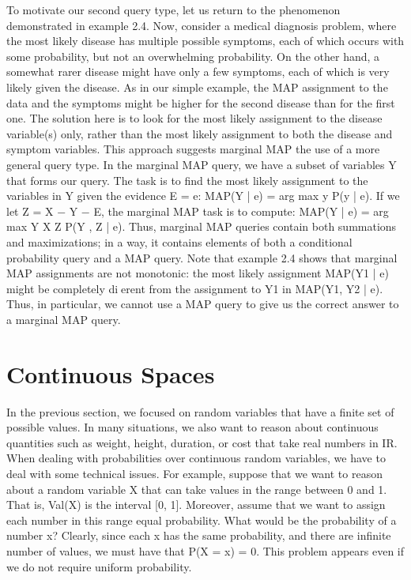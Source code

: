To motivate our second query type, let us return to the phenomenon demonstrated in example 2.4. Now, consider a medical diagnosis problem, where the most likely disease has multiple possible symptoms, each of which occurs with some probability, but not an overwhelming probability. On the other hand, a somewhat rarer disease might have only a few symptoms, each of which is very likely given the disease. As in our simple example, the MAP assignment to the data and the symptoms might be higher for the second disease than for the first one. The solution here is to look for the most likely assignment to the disease variable(s) only, rather than the most likely assignment to both the disease and symptom variables. This approach suggests marginal MAP the use of a more general query type. In the marginal MAP query, we have a subset of variables Y that forms our query. The task is to find the most likely assignment to the variables in Y given the evidence E = e: MAP(Y | e) = arg max y P(y | e). If we let Z = X − Y − E, the marginal MAP task is to compute: MAP(Y | e) = arg max Y X Z P(Y , Z | e). Thus, marginal MAP queries contain both summations and maximizations; in a way, it contains elements of both a conditional probability query and a MAP query. Note that example 2.4 shows that marginal MAP assignments are not monotonic: the most likely assignment MAP(Y1 | e) might be completely dierent from the assignment to Y1 in MAP({Y1, Y2} | e). Thus, in particular, we cannot use a MAP query to give us the correct answer to a marginal MAP query.

\section{Continuous Spaces}
In the previous section, we focused on random variables that have a finite set of possible values. In many situations, we also want to reason about continuous quantities such as weight, height, duration, or cost that take real numbers in IR. When dealing with probabilities over continuous random variables, we have to deal with some technical issues. For example, suppose that we want to reason about a random variable X that can take values in the range between 0 and 1. That is, Val(X) is the interval [0, 1]. Moreover, assume that we want to assign each number in this range equal probability. What would be the probability of a number x? Clearly, since each x has the same probability, and there are infinite number of values, we must have that P(X = x) = 0. This problem appears even if we do not require uniform probability.

